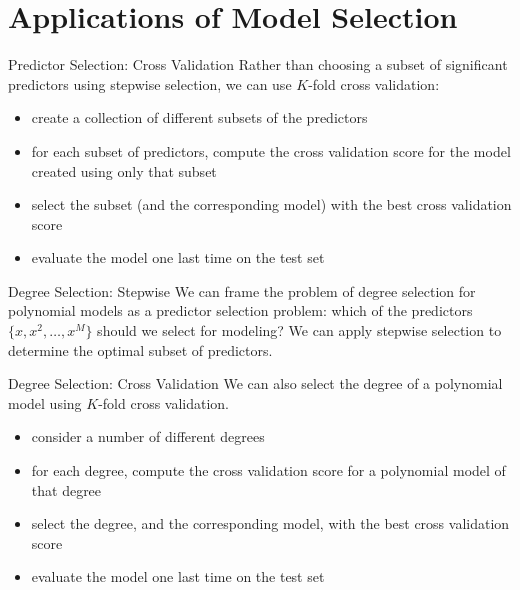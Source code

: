 \documentclass[12pt,t]{beamer}
\begin{document}
\section{Applications of Model Selection}

\begin{frame}{Predictor Selection: Cross Validation} 
Rather than choosing a subset of significant predictors using stepwise selection, we can use $K$-fold cross validation:
\vskip0.2cm
\begin{itemize}
\item create a collection of different subsets of the predictors
\vskip0.2cm
\item for each subset of predictors, compute the cross validation score for the model created using only that subset
\vskip0.2cm
\item select the subset (and the corresponding model) with the best cross validation score
\vskip0.2cm
\item evaluate the model one last time on the test set
\end{itemize}
\end{frame}

\begin{frame}{Degree Selection: Stepwise} 
We can frame the problem of degree selection for polynomial models as a predictor selection problem: which of the predictors $\{x, x^2, \ldots, x^M \}$ should we select for modeling?
\vskip0.4cm
We can apply stepwise selection to determine the optimal subset of predictors.
\end{frame}

\begin{frame}{Degree Selection: Cross Validation} 
We can also select the degree of a polynomial model using $K$-fold cross validation.
\vskip0.2cm
\begin{itemize}
\item consider a number of different degrees
\vskip0.2cm
\item for each degree, compute the cross validation score for a polynomial model of that degree
\vskip0.2cm
\item select the degree, and the corresponding model, with the best cross validation score
\vskip0.2cm
\item evaluate the model one last time on the test set
\end{itemize}

\end{frame}
\end{document}
